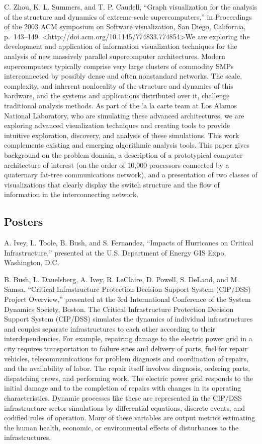 \documentclass[]{article}
\begin{document}
C. Zhou, K. L. Summers, and T. P. Caudell, ``Graph visualization for the
analysis of the structure and dynamics of extreme-scale
supercomputers,'' in Proceedings of the 2003 ACM symposium on Software
visualization, San Diego, California, p.~143--149.
\textless{}http://doi.acm.org/10.1145/774833.774854\textgreater{}We are
exploring the development and application of information visualization
techniques for the analysis of new massively parallel supercomputer
architectures. Modern supercomputers typically comprise very large
clusters of commodity SMPs interconnected by possibly dense and often
nonstandard networks. The scale, complexity, and inherent nonlocality of
the structure and dynamics of this hardware, and the systems and
applications distributed over it, challenge traditional analysis
methods. As part of the 'a la carte team at Los Alamos National
Laboratory, who are simulating these advanced architectures, we are
exploring advanced visualization techniques and creating tools to
provide intuitive exploration, discovery, and analysis of these
simulations. This work complements existing and emerging algorithmic
analysis tools. This paper gives background on the problem domain, a
description of a prototypical computer architecture of interest (on the
order of 10,000 processors connected by a quaternary fat-tree
communications network), and a presentation of two classes of
visualizations that clearly display the switch structure and the flow of
information in the interconnecting network.

\subsection{Posters}\label{posters}

A. Ivey, L. Toole, B. Bush, and S. Fernandez, ``Impacts of Hurricanes on
Critical Infrastructure,'' presented at the U.S. Department of Energy
GIS Expo, Washington, D.C.

B. Bush, L. Dauelsberg, A. Ivey, R. LeClaire, D. Powell, S. DeLand, and
M. Samsa, ``Critical Infrastructure Protection Decision Support System
(CIP/DSS) Project Overview,'' presented at the 3rd International
Conference of the System Dynamics Society, Boston. The Critical
Infrastructure Protection Decision Support System (CIP/DSS) simulates
the dynamics of individual infrastructures and couples separate
infrastructures to each other according to their interdependencies. For
example, repairing damage to the electric power grid in a city requires
transportation to failure sites and delivery of parts, fuel for repair
vehicles, telecommunications for problem diagnosis and coordination of
repairs, and the availability of labor. The repair itself involves
diagnosis, ordering parts, dispatching crews, and performing work. The
electric power grid responds to the initial damage and to the completion
of repairs with changes in its operating characteristics. Dynamic
processes like these are represented in the CIP/DSS infrastructure
sector simulations by differential equations, discrete events, and
codified rules of operation. Many of these variables are output metrics
estimating the human health, economic, or environmental effects of
disturbances to the infrastructures.
\end{document}
